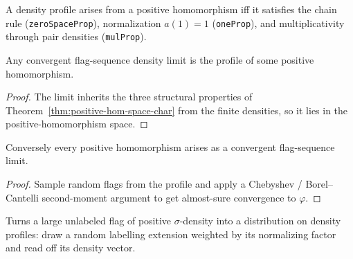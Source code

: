 \begin{theorem}
  \label{thm:positive-hom-space-char}
  \leanok
  A density profile arises from a positive homomorphism iff it satisfies the
  chain rule (\texttt{zeroSpaceProp}), normalization $a(1)=1$ (\texttt{oneProp}),
  and multiplicativity through pair densities (\texttt{mulProp}).
\end{theorem}

\begin{theorem}
  \label{thm:limit-is-hom}
  \leanok
  Any convergent flag-sequence density limit is the profile of some positive
  homomorphism.
\end{theorem}
\begin{proof}\leanok
  The limit inherits the three structural properties of
  Theorem~\ref{thm:positive-hom-space-char} from the finite densities, so it lies
  in the positive-homomorphism space.
\end{proof}

\begin{theorem}
  \label{thm:hom-is-limit}
  \leanok
  Conversely every positive homomorphism arises as a convergent flag-sequence
  limit.
\end{theorem}
\begin{proof}\leanok
  Sample random flags from the profile and apply a Chebyshev / Borel--Cantelli
  second-moment argument to get almost-sure convergence to $\varphi$.
\end{proof}

\begin{definition}
  \label{def:finflag-pmf}
  \leanok
  Turns a large unlabeled flag of positive $\sigma$-density into a distribution
  on density profiles: draw a random labelling extension weighted by its
  normalizing factor and read off its density vector.
\end{definition}

